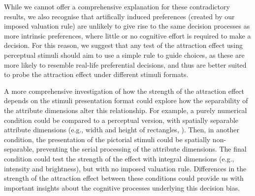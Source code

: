 \documentclass[11pt,a4paper]{article}
\begin{document}
While we cannot offer a comprehensive explanation for these contradictory results, we also recognise that artifically induced preferences (created by our imposed valuation rule) are unlikely to give rise to the same decision processes as more  intrinsic preferences, where little or no cognitive effort is required to make a decision. For this reason, we suggest that any test of the attraction effect using perceptual stimuli should aim to use a simple rule to guide choices, as these are more likely to resemble real-life preferential decisions, and thus are better suited to probe the attraction effect under different stimuli formats. 

A more comprehensive investigation of how the strength of the attraction effect depends on the stimuli presentation format could explore how the separability of the attribute dimensions alter this relationship. For example, a purely numerical condition could be compared to a perceptual version, with spatially separable attribute dimensions (e.g., width and height of rectangles, ). Then, in another condition, the presentation of the pictorial stimuli could be spatially non-separable, preventing the serial processing of the attribute dimensions. The final condition could test the strength of the effect with integral dimensions (e.g., intensity and brightness), but with no imposed valuation rule. Differences in the strength of the attraction effect between these conditions could provide us with important insights about the cognitive processes underlying this decision bias.




\newpage


\end{document}
